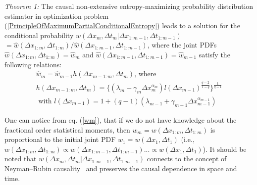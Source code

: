 \textit{Theorem 1:} The causal non-extensive entropy-maximizing probability distribution estimator in optimization problem (\ref{PrincipleOfMaximumPartialConditionalEntropy}) leads to a solution for the conditional probability $\hat{w}(\Delta x_{m},\Delta t_{m}|\Delta x_{1:m-1}, \Delta t_{1:m-1})$ $= \hat{w}(\Delta x_{1:m},\Delta t_{1:m}) / \hat{w}(\Delta x_{1:m-1},\Delta t_{1:m-1})$, where the joint PDFs $\hat{w}(\Delta x_{1:m},\Delta t_{1:m}) = \hat{w}_{m}$ and $\hat{w}(\Delta x_{1:m-1},\Delta t_{1:m-1}) = \hat{w}_{m-1}$ satisfy the following relations:
\begin{eqnarray}
\label{wm}
&\hat{w}_{m} = \hat{w}_{m-1} h(\Delta x_{m-1:m}, \Delta t_{m}) \mbox{, where } &\\
&h(\Delta x_{m-1:m}, \Delta t_{m}) =\lbrace(\lambda_{m}-\gamma_{m}\Delta x_{m}^{\alpha_{m}})l(\Delta x_{m-1})^{\frac{q-2}{1-q}}\rbrace^{\frac{1}{q-1}} &\nonumber\\
&\mbox{ with } l(\Delta x_{m-1}) = 1 + (q-1)(\lambda_{m-1} + \gamma_{m-1}\Delta x_{m-1}^{\alpha_{m-1}}) & \nonumber
\end{eqnarray}

One can notice from eq. (\ref{wm}), that if we do not have knowledge about the fractional order statistical moments, then $ w_{m}= w(\Delta x_{1:m}, \Delta t_{1:m}) $ is proportional to the initial joint PDF $w_{1} = w(\Delta x_{1},\Delta t_{1})$ (i.e., $w(\Delta x_{1:m}, \Delta t_{1:m}) \propto w(\Delta x_{1:m-1}, \Delta t_{1:m-1}) ... \propto w(\Delta x_{1}, \Delta t_{1})$). It should be noted that $w(\Delta x_{m},\Delta t_{m}|\Delta x_{1:m-1}, \Delta t_{1:m-1})$ connects to the concept of Neyman–Rubin causality~\cite{rubin2005causal} and preserves the causal dependence in space and time.
